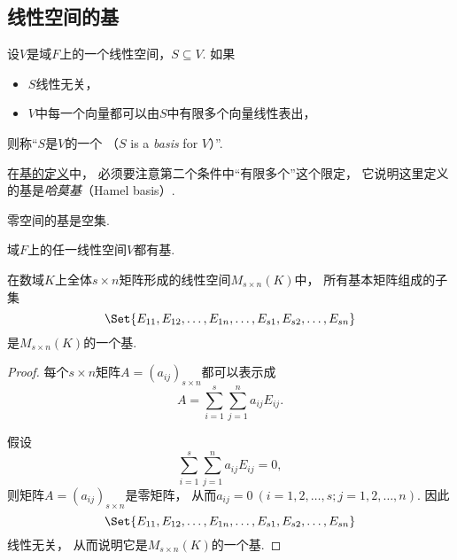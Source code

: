 \subsection{线性空间的基}
\begin{definition}\label{definition:线性空间.线性空间的基}
设\(V\)是域\(F\)上的一个线性空间，\(S \subseteq V\).
如果\begin{itemize}
	\item \(S\)线性无关，
	\item \(V\)中每一个向量都可以由\(S\)中有限多个向量线性表出，
\end{itemize}
则称“\(S\)是\(V\)的一个%
（\(S\) is a \emph{basis} for \(V\)）”.
\end{definition}
\begin{remark}
在\hyperref[definition:线性空间.线性空间的基]{基的定义}中，
必须要注意第二个条件中“有限多个”这个限定，
它说明这里定义的基是\emph{哈莫基}（Hamel basis）.
\end{remark}

\begin{property}\label{theorem:线性空间的结构.零空间的基是空集}
零空间的基是空集.
\end{property}

\begin{property}
域\(F\)上的任一线性空间\(V\)都有基.
\end{property}

\begin{example}
在数域\(K\)上全体\(s \times n\)矩阵形成的线性空间\(M_{s \times n}(K)\)中，
所有基本矩阵组成的子集\[
	\Set{
		E_{11},E_{12},\dotsc,E_{1n},
		\dotsc,
		E_{s1},E_{s2},\dotsc,E_{sn}
	}
\]是\(M_{s \times n}(K)\)的一个基.
\begin{proof}
每个\(s \times n\)矩阵\(A = (a_{ij})_{s \times n}\)都可以表示成\[
	A = \sum_{i=1}^s \sum_{j=1}^n a_{ij} E_{ij}.
\]

假设\[
	\sum_{i=1}^s \sum_{j=1}^n a_{ij} E_{ij} = 0,
\]
则矩阵\(A = (a_{ij})_{s \times n}\)是零矩阵，
从而\(a_{ij} = 0\ (i=1,2,\dotsc,s;j=1,2,\dotsc,n)\).
因此\[
	\Set{
		E_{11},E_{12},\dotsc,E_{1n},
		\dotsc,
		E_{s1},E_{s2},\dotsc,E_{sn}
	}
\]线性无关，
从而说明它是\(M_{s \times n}(K)\)的一个基.
\end{proof}
\end{example}

